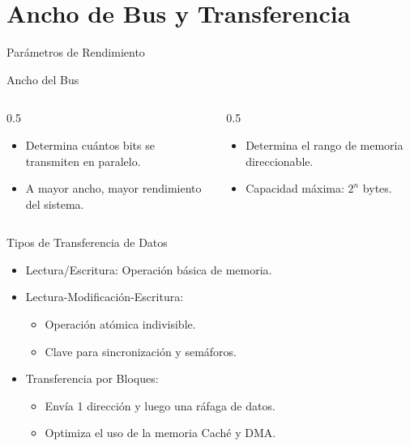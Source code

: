 \documentclass[presentation]{beamer}
\begin{document}
\section{Ancho de Bus y Transferencia}
\label{sec:org2932d42}
\begin{frame}[label={sec:orge58bb54}]{Parámetros de Rendimiento}
\begin{block}{Ancho del Bus}
\begin{columns}
\begin{column}{0.5\columnwidth}
\begin{itemize}
\item Determina cuántos bits se transmiten en paralelo.
\item A mayor ancho, mayor rendimiento del sistema.
\end{itemize}
\end{column}
\begin{column}{0.5\columnwidth}
\begin{itemize}
\item Determina el rango de memoria direccionable.
\item Capacidad máxima: \(2^{n}\) bytes.
\end{itemize}
\end{column}
\end{columns}
\end{block}

\begin{block}{Tipos de Transferencia de Datos}
\begin{itemize}
\item \alert{Lectura/Escritura}: Operación básica de memoria.
\item \alert{Lectura-Modificación-Escritura}: 
\begin{itemize}
\item Operación atómica indivisible.
\item Clave para sincronización y semáforos.
\end{itemize}
\item \alert{Transferencia por Bloques}:
\begin{itemize}
\item Envía 1 dirección y luego una ráfaga de datos.
\item Optimiza el uso de la memoria Caché y DMA.
\end{itemize}
\end{itemize}
\end{block}
\end{frame}
\end{document}
